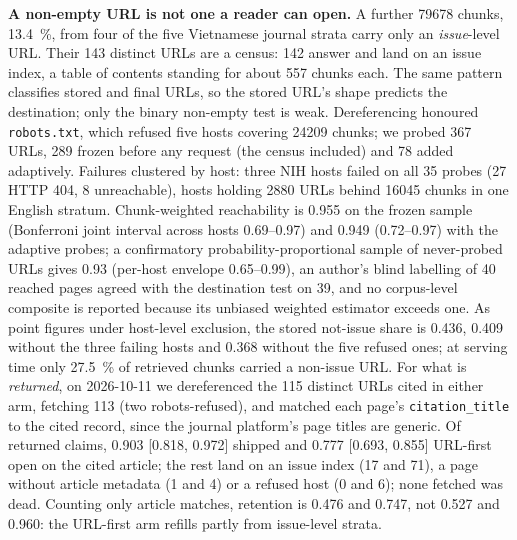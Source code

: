 \documentclass[conference,a4paper]{IEEEtran}
\begin{document}
\textbf{A non-empty URL is not one a reader can open.} A further \num{79678} chunks,
\SI{13.4}{\percent}, from four of the five Vietnamese journal strata carry only an
\emph{issue}-level URL. Their \num{143} distinct URLs are a census: \num{142} answer and land
on an issue index, a table of contents standing for about \num{557} chunks each. The same
pattern classifies stored and final URLs, so the
stored URL's shape predicts the destination; only the binary non-empty test is weak.
Dereferencing honoured \texttt{robots.txt}, which refused five hosts covering \num{24209}
chunks; we probed \num{367} URLs, \num{289} frozen before any request (the census included)
and \num{78} added adaptively. Failures clustered by host: three NIH hosts failed on all
\num{35} probes (27 HTTP 404, 8 unreachable), hosts holding \num{2880} URLs behind
\num{16045} chunks in one English stratum. Chunk-weighted reachability is \num{0.955} on the
frozen sample (Bonferroni joint interval across hosts \numrange{0.69}{0.97}) and \num{0.949}
(\numrange{0.72}{0.97}) with the adaptive probes; a confirmatory probability-proportional
sample of never-probed URLs gives \num{0.93} (per-host envelope \numrange{0.65}{0.99}), an
author's blind labelling of \num{40} reached pages agreed with the destination test on
\num{39}, and no corpus-level composite is reported because its unbiased weighted estimator
exceeds one. As point figures under host-level exclusion, the stored
not-issue share is \num{0.436}, \num{0.409} without the three failing hosts and \num{0.368}
without the five refused ones; at serving time only \SI{27.5}{\percent} of retrieved chunks
carried a non-issue URL. For what is \emph{returned}, on 2026-10-11 we dereferenced the
\num{115} distinct URLs cited in either arm, fetching \num{113} (two robots-refused), and
matched each page's \texttt{citation\_title} to the cited record, since the journal
platform's page titles are generic. Of returned claims,
\num{0.903} [\num{0.818}, \num{0.972}] shipped and \num{0.777} [\num{0.693}, \num{0.855}]
URL-first open on the cited article; the rest land on an issue index (17 and 71), a page
without article metadata (1 and 4) or a refused host (0 and 6); none fetched was dead.
Counting only article matches, retention is \num{0.476} and \num{0.747}, not \num{0.527}
and \num{0.960}: the URL-first arm refills partly from issue-level strata.
\end{document}
